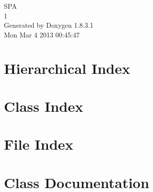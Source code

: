 \documentclass{book}
\begin{document}
\hypersetup{pageanchor=false,citecolor=blue}
\begin{titlepage}
\vspace*{7cm}
\begin{center}
{\Large S\-P\-A \\[1ex]\large 1 }\\
\vspace*{1cm}
{\large Generated by Doxygen 1.8.3.1}\\
\vspace*{0.5cm}
{\small Mon Mar 4 2013 00:45:47}\\
\end{center}
\end{titlepage}
\clearemptydoublepage
{}
\tableofcontents
\clearemptydoublepage
{}
\hypersetup{pageanchor=true,citecolor=blue}
\chapter{Hierarchical Index}

\chapter{Class Index}

\chapter{File Index}

\chapter{Class Documentation}










































\end{document}
